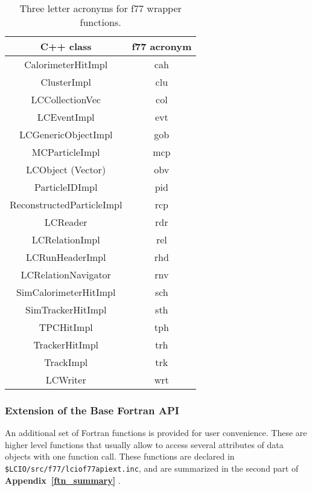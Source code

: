 \begin{table}
\begin{center}
\begin{tabular}{|c|c|}
\hline
\rule[-5mm]{0mm}{10mm} C++ class  &  f77 acronym   \\ \hline \hline

 CalorimeterHitImpl         & cah \\ \hline
 ClusterImpl                & clu \\ \hline
 LCCollectionVec            & col \\ \hline
 LCEventImpl                & evt \\ \hline
 LCGenericObjectImpl        & gob \\ \hline
 MCParticleImpl             & mcp \\ \hline
 LCObject (Vector)          & obv \\ \hline
 ParticleIDImpl             & pid \\ \hline
 ReconstructedParticleImpl  & rcp \\ \hline
 LCReader                   & rdr \\ \hline
 LCRelationImpl             & rel \\ \hline
 LCRunHeaderImpl            & rhd \\ \hline
 LCRelationNavigator        & rnv \\ \hline
 SimCalorimeterHitImpl      & sch \\ \hline
 SimTrackerHitImpl          & sth \\ \hline
 TPCHitImpl                 & tph \\ \hline
 TrackerHitImpl             & trh \\ \hline
 TrackImpl                  & trk \\ \hline
 LCWriter                   & wrt \\ \hline

\end{tabular}
\end{center}
\caption{Three letter acronyms for f77 wrapper functions.}
\label{tab_f77}
\end{table}


\subsubsection{Extension of the Base Fortran API} \label{f77ext}

An additional set of Fortran functions is provided for user convenience. These are higher level functions
that usually allow to access several attributes of data objects with one function call.
These functions are declared in \verb#$LCIO/src/f77/lciof77apiext.inc#,
and are summarized in the second part of {\bf Appendix~\ref{ftn_summary} }.

